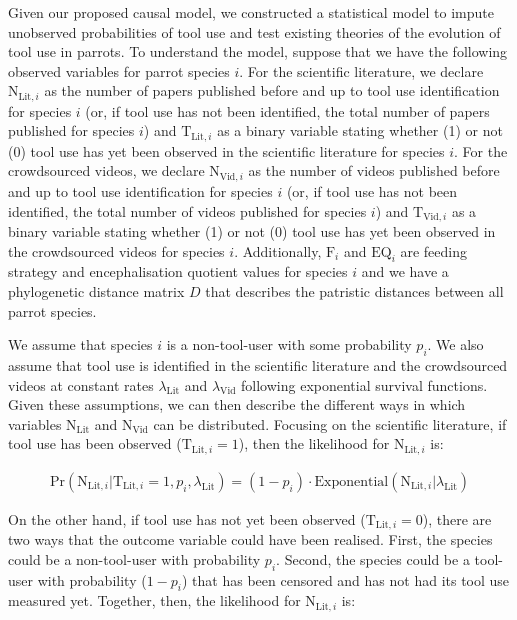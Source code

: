 \documentclass[
  man,floatsintext]{apa6}
\begin{document}
Given our proposed causal model, we constructed a statistical model to impute
unobserved probabilities of tool use and test existing theories of the evolution
of tool use in parrots. To understand the model, suppose that we have the
following observed variables for parrot species \(i\). For the scientific
literature, we declare \(\text{N}_{\text{Lit},i}\) as the number of papers
published before and up to tool use identification for species \(i\) (or, if tool
use has not been identified, the total number of papers published for species
\(i\)) and \(\text{T}_{\text{Lit},i}\) as a binary variable stating whether (1) or
not (0) tool use has yet been observed in the scientific literature for species
\(i\). For the crowdsourced videos, we declare \(\text{N}_{\text{Vid},i}\) as the
number of videos published before and up to tool use identification for species
\(i\) (or, if tool use has not been identified, the total number of videos
published for species \(i\)) and \(\text{T}_{\text{Vid},i}\) as a binary variable
stating whether (1) or not (0) tool use has yet been observed in the
crowdsourced videos for species \(i\). Additionally, \(\text{F}_i\) and
\(\text{EQ}_i\) are feeding strategy and encephalisation quotient values for
species \(i\) and we have a phylogenetic distance matrix \(D\) that describes the
patristic distances between all parrot species.

We assume that species \(i\) is a non-tool-user with some
probability \(p_i\). We also assume that tool use is identified in the scientific
literature and the crowdsourced videos at constant rates \(\lambda_{\text{Lit}}\)
and \(\lambda_{\text{Vid}}\) following exponential survival functions. Given these
assumptions, we can then describe the different ways in which variables
\(\text{N}_\text{Lit}\) and \(\text{N}_\text{Vid}\) can be distributed. Focusing on
the scientific literature, if tool use has been observed
(\(\text{T}_{\text{Lit},i} = 1\)), then the likelihood for
\(\text{N}_{\text{Lit},i}\) is:

\begin{align}
\text{Pr}(\text{N}_{\text{Lit},i}|\text{T}_{\text{Lit},i} = 1,p_i,\lambda_\text{Lit}) = (1-p_i)\cdot\text{Exponential}(\text{N}_{\text{Lit},i}|\lambda_\text{Lit})
\end{align}

On the other hand, if tool use has not yet been observed
(\(\text{T}_{\text{Lit},i} = 0\)), there are two ways that the outcome variable
could have been realised. First, the species could be a non-tool-user with
probability \(p_i\). Second, the species could be a tool-user with probability
(\(1 - p_i\)) that has been censored and has not had its tool use measured yet.
Together, then, the likelihood for \(\text{N}_{\text{Lit},i}\) is:
\end{document}
